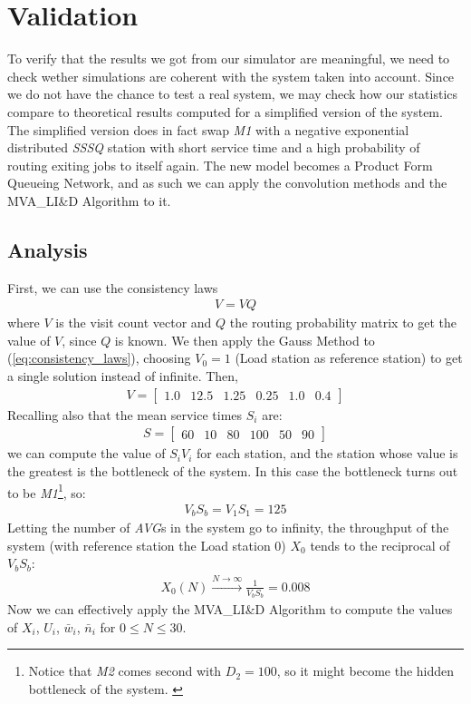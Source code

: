 \documentclass[paper=a4, fontsize=11pt]{scrartcl}
\numberwithin{equation}{section}		%
\numberwithin{figure}{section}			%
\numberwithin{table}{section}				%
\begin{document}

\section{Validation}
To verify that the results we got from our simulator are meaningful, we need to check wether simulations are coherent with the system taken into account. Since we do not have the chance to test a real system, we may check how our statistics compare to theoretical results computed for a simplified version of the system. The simplified version does in fact swap \textit{M1} with a negative exponential distributed \textit{SSSQ} station with short service time and a high probability of routing exiting jobs to itself again.
The new model becomes a Product Form Queueing Network, and as such we can apply the convolution methods and the MVA\_LI\&D Algorithm to it.

\subsection{Analysis} \label{subsec:analysis}
First, we can use the consistency laws
\begin{align}
V = VQ \label{eq:consistency_laws}
\end{align}
where $V$ is the visit count vector and $Q$ the routing probability matrix to get the value of $V$, since $Q$ is known. We then apply the Gauss Method to (\ref{eq:consistency_laws}), choosing $V_0 = 1$ (Load station as reference station) to get a single solution instead of infinite.
Then,
\begin{align}
V = \begin{bmatrix}1.0 & 12.5 & 1.25 & 0.25 & 1.0 & 0.4\end{bmatrix}
\end{align}
Recalling also that the mean service times $S_i$ are:
\begin{align}
S = \begin{bmatrix}60 & 10 & 80 & 100 & 50 & 90\end{bmatrix}
\end{align}
we can compute the value of $S_i V_i$ for each station, and the station whose value is the greatest is the bottleneck of the system. In this case the bottleneck turns out to be \textit{M1}\footnote{Notice that \textit{M2} comes second with $D_2 = 100$, so it might become the hidden bottleneck of the system. \label{ftn:hidden_bottleneck}}, so:
\begin{align}
V_b S_b = V_1 S_1 = 125 \label{eq:VbSb}
\end{align}
Letting the number of \textit{AVG}s in the system go to infinity, the throughput of the system (with reference station the Load station 0) $X_0$ tends to the reciprocal of $V_b S_b$:
\begin{align}
X_0(N) \xrightarrow{N\to\infty} \frac{1}{V_b S_b} = 0.008
\end{align}
Now we can effectively apply the MVA\_LI\&D Algorithm to compute the values of $X_i$, $U_i$, $\bar{w}_i$, $\bar{n}_i$ for $0 \le N \le 30$.
\end{document}
